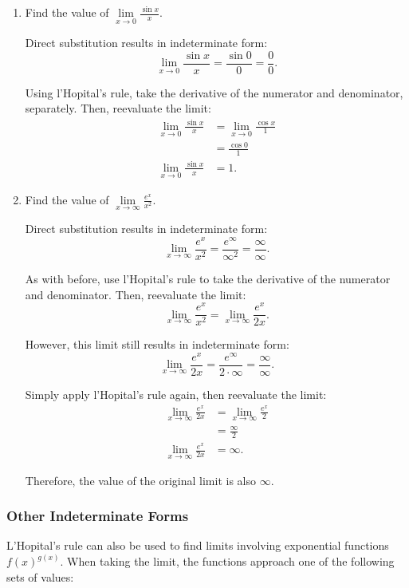 \documentclass[12pt]{article}
\begin{document}
\begin{enumerate}
	\item Find the value of $\lim \limits_{x \to 0} \frac{\sin x}{x}$.

	Direct substitution results in indeterminate form:
	\[ \lim_{x \to 0} \frac{\sin x}{x} = \frac{\sin 0}{0} = \frac{0}{0}. \]

	Using l'Hopital's rule, take the derivative of the numerator and denominator, separately. Then, reevaluate the limit:
	\begin{align*}
		\lim_{x \to 0} \frac{\sin x}{x} &= \lim_{x \to 0} \frac{\cos x}{1} \\[5pt]
		&= \frac{\cos 0}{1} \\[5pt]
		\lim_{x \to 0} \frac{\sin x}{x} &= 1.
	\end{align*}

	\item Find the value of $\lim \limits_{x \to \infty} \frac{e^x}{x^2}$.

	Direct substitution results in indeterminate form:
	\[ \lim_{x \to \infty} \frac{e^x}{x^2} = \frac{e^\infty}{\infty^2} = \frac{\infty}{\infty}. \]

	As with before, use l'Hopital's rule to take the derivative of the numerator and denominator. Then, reevaluate the limit:
	\[ \lim_{x \to \infty} \frac{e^x}{x^2} = \lim_{x \to \infty} \frac{e^x}{2x}. \]

	However, this limit still results in indeterminate form:
	\[ \lim_{x \to \infty} \frac{e^x}{2x} = \frac{e^\infty}{2 \cdot \infty} = \frac{\infty}{\infty}. \]

	Simply apply l'Hopital's rule again, then reevaluate the limit:
	\begin{align*}
		\lim_{x \to \infty} \frac{e^x}{2x} &= \lim_{x \to \infty} \frac{e^x}{2} \\[5pt]
		&= \frac{\infty}{2} \\[5pt]
		\lim_{x \to \infty} \frac{e^x}{2x} &= \infty.
	\end{align*}

	Therefore, the value of the original limit is also $\infty$.
\end{enumerate}

\subsubsection{Other Indeterminate Forms}
L'Hopital's rule can also be used to find limits involving exponential functions $f(x)^{g(x)}$. When taking the limit, the functions approach one of the following sets of values:
\end{document}
